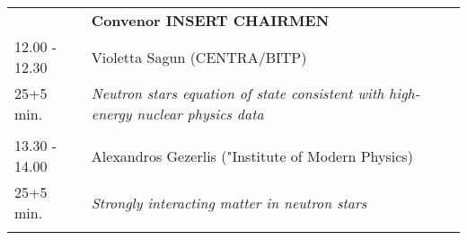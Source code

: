 \begin{longtable}{p{3cm}p{13cm}}
&\hfill {\bf Convenor INSERT CHAIRMEN }\\ 
12.00 - 12.30 & Violetta Sagun (CENTRA/BITP)\\ 
25+5 min. & {\it Neutron stars equation of state consistent with high-energy nuclear physics data}\\ 
 & \\ 
13.30 - 14.00 & Alexandros Gezerlis ("Institute of Modern Physics)\\ 
25+5 min. & {\it Strongly interacting matter in neutron stars}\\ 
 & \\ 
\end{longtable}

